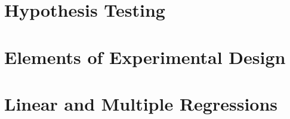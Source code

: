 \documentclass[xcolor={dvipsnames},justified]{tufte-book}
\begin{document}
\chapter{Hypothesis Testing}






















\chapter{Elements of Experimental Design}













\chapter{Linear and Multiple Regressions}




















\end{document}
